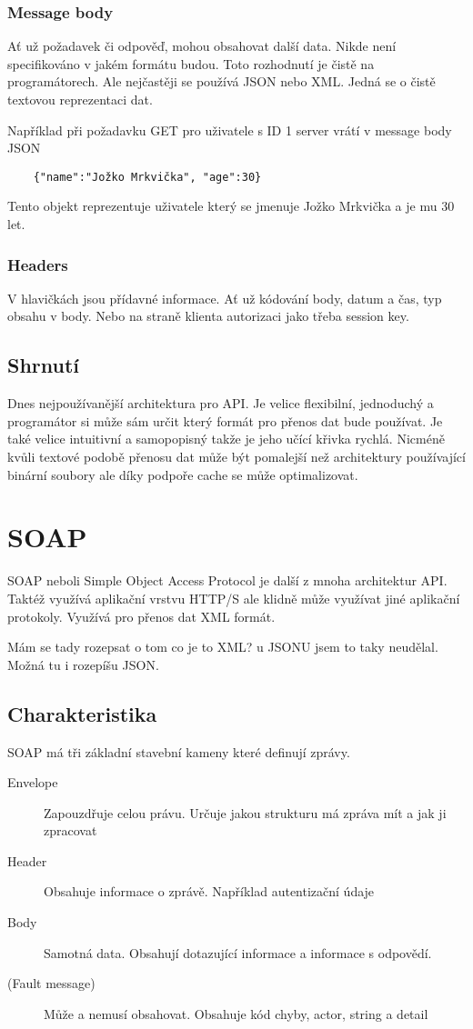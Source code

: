 \subsubsection{Message body}
Ať už požadavek či odpověď, mohou obsahovat další data. Nikde není specifikováno v jakém formátu budou. Toto rozhodnutí je čistě na programátorech. Ale nejčastěji se používá JSON nebo XML. Jedná se o čistě textovou reprezentaci dat.

Například při požadavku GET pro uživatele s ID 1 server vrátí v message body JSON
\begin{verbatim}
	{"name":"Jožko Mrkvička", "age":30}
\end{verbatim}
Tento objekt reprezentuje uživatele který se jmenuje Jožko Mrkvička a je mu 30 let.

\subsubsection{Headers}
V hlavičkách jsou přídavné informace. Ať už kódování body, datum a čas, typ obsahu v body. Nebo na straně klienta autorizaci jako třeba session key.

\subsection{Shrnutí}
Dnes nejpoužívanější architektura pro API. Je velice flexibilní, jednoduchý a programátor si může sám určit který formát pro přenos dat bude používat. Je také velice intuitivní a samopopisný takže je jeho učící křivka rychlá. Nicméně kvůli textové podobě přenosu dat může být pomalejší než architektury používající binární soubory ale díky podpoře cache se může optimalizovat.

\section{SOAP}
SOAP neboli Simple Object Access Protocol je další z mnoha architektur API. Taktéž využívá aplikační vrstvu HTTP/S ale klidně může využívat jiné aplikační protokoly. Využívá pro přenos dat XML formát.

Mám se tady rozepsat o tom co je to XML? u JSONU jsem to taky neudělal. Možná tu i rozepíšu JSON.

\subsection{Charakteristika}
SOAP má tři základní stavební kameny které definují zprávy.
\begin{description}
    \item[Envelope] Zapouzdřuje celou právu. Určuje jakou strukturu má zpráva mít a jak ji zpracovat
    \item[Header] Obsahuje informace o zprávě. Například autentizační údaje
    \item[Body] Samotná data. Obsahují dotazující informace a informace s odpovědí.
    \item[(Fault message)] Může a nemusí obsahovat. Obsahuje kód chyby, actor, string a detail
\end{description}

